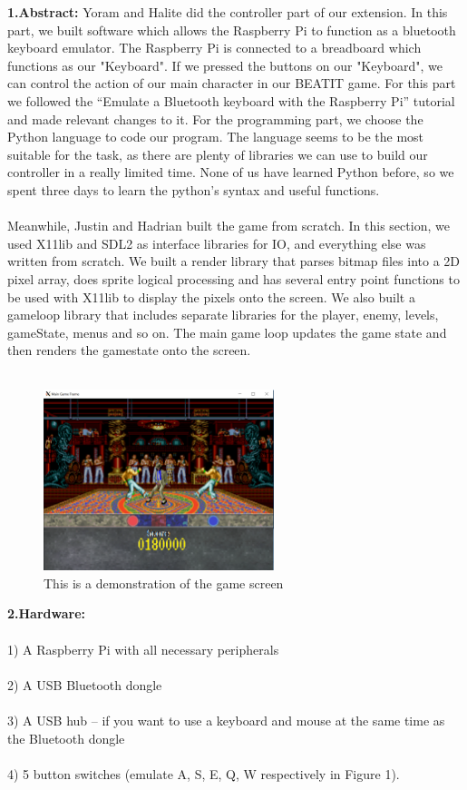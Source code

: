 \documentclass[a4paper]{article}
\begin{document}
\setlength{\parindent}{0cm}
\textbf{1.Abstract:}  Yoram and Halite did the controller part of our extension. In this part, we built software which allows the Raspberry Pi to function as a bluetooth keyboard emulator. The Raspberry Pi is connected to a breadboard which functions as our "Keyboard". If we pressed the buttons on our "Keyboard", we can control the action of our main character in our BEATIT game. For this part we followed the “Emulate a Bluetooth keyboard with the Raspberry Pi” tutorial and made relevant changes to it.
For the programming part, we choose the Python language to code our program. The language seems to be the most suitable for the task, as there are plenty of libraries we can use to build our controller in a really limited time. None of us have learned Python before, so we spent three days to learn the python’s syntax and useful functions.\\\\
Meanwhile, Justin and Hadrian built the game from scratch. In this section, we used X11lib and SDL2 as interface libraries for IO, and everything else was written from scratch. We built a render library that parses bitmap files into a 2D pixel array, does sprite logical processing and has several entry point functions to be used with X11lib to display the pixels onto the screen. We also built a gameloop library that includes separate libraries for the player, enemy, levels, gameState, menus and so on. The main game loop updates the game state and then renders the gamestate onto the screen.\\\\

\begin{figure}[h]
\centering
\includegraphics[width=0.6\textwidth]{game_graphics.png}
\caption{\label{fig:pi}This is a demonstration of the game screen}
\end{figure}


\setlength{\parindent}{0cm}
\textbf{2.Hardware:}\\\\
1) A Raspberry Pi with all necessary peripherals   \\\\
2) A USB Bluetooth dongle \\\\
3) A USB hub – if you want to use a keyboard and mouse at the same time as the Bluetooth dongle  \\\\
4) 5 button switches  (emulate A, S, E, Q, W respectively in Figure 1).  \\\\
\end{document}
